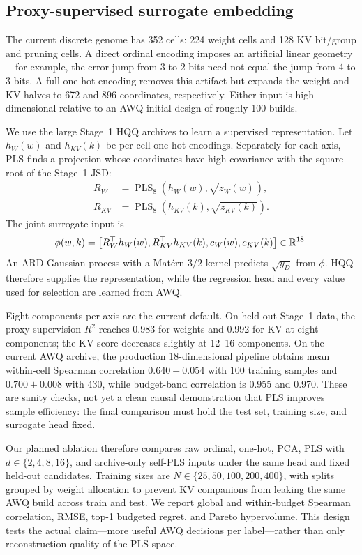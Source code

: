 \subsection{Proxy-supervised surrogate embedding}
\label{sec:pls}

The current discrete genome has 352 cells: 224 weight cells and 128 KV bit/group
and pruning cells.  A direct ordinal encoding imposes an artificial linear
geometry---for example, the error jump from 3 to 2 bits need not equal the jump
from 4 to 3 bits.  A full one-hot encoding removes this artifact but expands the
weight and KV halves to 672 and 896 coordinates, respectively.  Either input is
high-dimensional relative to an AWQ initial design of roughly 100 builds.

We use the large Stage~1 HQQ archives to learn a supervised representation.
Let $h_W(w)$ and $h_{KV}(k)$ be per-cell one-hot encodings.  Separately for each
axis, PLS finds a projection whose coordinates have high covariance with the
square root of the Stage~1 JSD:
\begin{align}
 R_W &= \operatorname{PLS}_8\!\left(h_W(w),\sqrt{z_W(w)}\right),\\
 R_{KV} &= \operatorname{PLS}_8\!\left(h_{KV}(k),\sqrt{z_{KV}(k)}\right).
 \label{eq:pls}
\end{align}
The joint surrogate input is
\begin{equation}
 \phi(w,k)=\left[R_W^\top h_W(w),
                   R_{KV}^\top h_{KV}(k),
                   c_W(w),c_{KV}(k)\right]\in\mathbb{R}^{18}.
 \label{eq:embedding}
\end{equation}
An ARD Gaussian process with a Mat\'ern-$3/2$ kernel predicts
$\sqrt{y_D}$ from $\phi$.  HQQ therefore supplies the representation, while the
regression head and every value used for selection are learned from AWQ.

Eight components per axis are the current default.  On held-out Stage~1 data,
the proxy-supervision $R^2$ reaches 0.983 for weights and 0.992 for KV at eight
components; the KV score decreases slightly at 12--16 components.  On the
current AWQ archive, the production 18-dimensional pipeline obtains mean
within-cell Spearman correlation $0.640\pm0.054$ with 100 training samples and
$0.700\pm0.008$ with 430, while budget-band correlation is 0.955 and 0.970.
These are sanity checks, not yet a clean causal demonstration that PLS improves
sample efficiency: the final comparison must hold the test set, training size,
and surrogate head fixed.

Our planned ablation therefore compares raw ordinal, one-hot, PCA, PLS with
$d\in\{2,4,8,16\}$, and archive-only self-PLS inputs under the same head and
fixed held-out candidates.  Training sizes are
$N\in\{25,50,100,200,400\}$, with splits grouped by weight allocation to prevent
KV companions from leaking the same AWQ build across train and test.  We report
global and within-budget Spearman correlation, RMSE, top-1 budgeted regret, and
Pareto hypervolume.  This design tests the actual claim---more useful AWQ
decisions per label---rather than only reconstruction quality of the PLS space.


